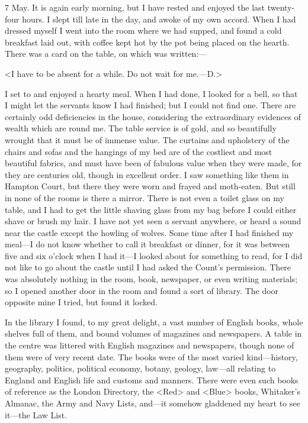 \begin{diary}{7 May.}
It is again early morning, but I have rested and enjoyed the last twenty-four hours. I slept till late in the day, and awoke of my own accord. When I had dressed myself I went into the room where we had supped, and found a cold breakfast laid out, with coffee kept hot by the pot being placed on the hearth. There was a card on the table, on which was written:—

<I have to be absent for a while. Do not wait for me.—D\@.> 

I set to and enjoyed a hearty meal. When I had done, I looked for a bell, so that I might let the servants know I had finished; but I could not find one. There are certainly odd deficiencies in the house, considering the extraordinary evidences of wealth which are round me. The table service is of gold, and so beautifully wrought that it must be of immense value. The curtains and upholstery of the chairs and sofas and the hangings of my bed are of the costliest and most beautiful fabrics, and must have been of fabulous value when they were made, for they are centuries old, though in excellent order. I saw something like them in Hampton Court, but there they were worn and frayed and moth-eaten. But still in none of the rooms is there a mirror. There is not even a toilet glass on my table, and I had to get the little shaving glass from my bag before I could either shave or brush my hair. I have not yet seen a servant anywhere, or heard a sound near the castle except the howling of wolves. Some time after I had finished my meal—I do not know whether to call it breakfast or dinner, for it was between five and six o'clock when I had it—I looked about for something to read, for I did not like to go about the castle until I had asked the Count's permission. There was absolutely nothing in the room, book, newspaper, or even writing materials; so I opened another door in the room and found a sort of library. The door opposite mine I tried, but found it locked.

In the library I found, to my great delight, a vast number of English books, whole shelves full of them, and bound volumes of magazines and newspapers. A table in the centre was littered with English magazines and newspapers, though none of them were of very recent date. The books were of the most varied kind—history, geography, politics, political economy, botany, geology, law—all relating to England and English life and customs and manners. There were even such books of reference as the London Directory, the <Red> and <Blue> books, Whitaker's Almanac, the Army and Navy Lists, and—it somehow gladdened my heart to see it—the Law List.


\end{diary}
